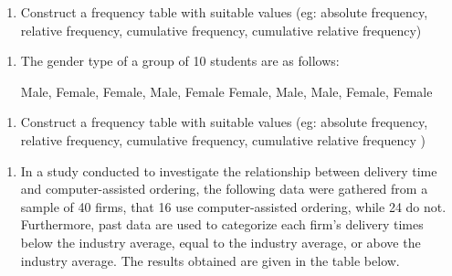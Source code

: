 \documentclass[]{book}
\providecommand{\tightlist}{%
  \setlength{\itemsep}{0pt}\setlength{\parskip}{0pt}}
\begin{document}
\begin{enumerate}
\def\labelenumi{\alph{enumi}.}
\tightlist
\item
  Construct a frequency table with suitable values (eg: absolute frequency, relative frequency, cumulative frequency, cumulative relative frequency)
\end{enumerate}

\begin{enumerate}
\def\labelenumi{\arabic{enumi}.}
\setcounter{enumi}{3}
\item
  The gender type of a group of 10 students are as follows:

  Male, Female, Female, Male, Female
  Female, Male, Male, Female, Female
\end{enumerate}

\begin{enumerate}
\def\labelenumi{\alph{enumi}.}
\tightlist
\item
  Construct a frequency table with suitable values (eg: absolute frequency, relative frequency, cumulative frequency, cumulative relative frequency )
\end{enumerate}

\begin{enumerate}
\def\labelenumi{\arabic{enumi}.}
\setcounter{enumi}{4}
\tightlist
\item
  In a study conducted to investigate the relationship between delivery time and computer-assisted ordering, the following data were gathered from a sample of 40 firms, that 16 use computer-assisted ordering, while 24 do not. Furthermore, past data are used to categorize each firm's delivery times below the industry average, equal to the industry average, or above the industry average. The results obtained are given in the table below.
\end{enumerate}
\end{document}
